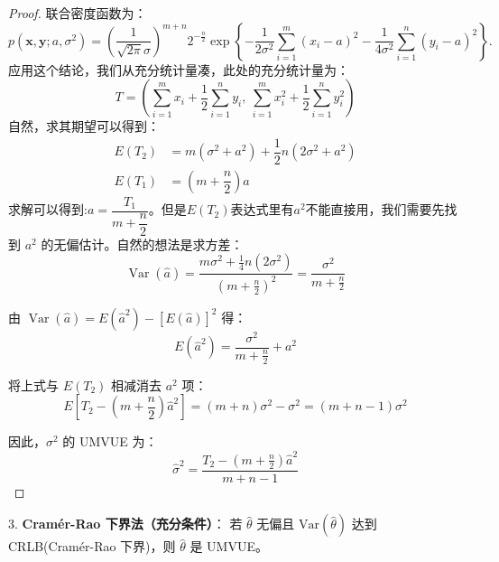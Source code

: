 \documentclass[a4paper]{ctexart}
\begin{document}
\begin{proof}
    联合密度函数为：
    \begin{equation}
    p(\boldsymbol{x}, \boldsymbol{y}; a, \sigma^2) = \left( \frac{1}{\sqrt{2\pi}\sigma} \right)^{m+n} 2^{-\frac{n}{2}} \exp \left\{ -\frac{1}{2\sigma^2} \sum_{i=1}^m (x_i - a)^2 - \frac{1}{4\sigma^2} \sum_{i=1}^n (y_i - a)^2 \right\}.
    \end{equation}
    应用这个结论，我们从充分统计量凑，此处的充分统计量为：
    \begin{equation}
        T = \left( \sum_{i=1}^m x_i + \frac{1}{2} \sum_{i=1}^n y_i,\ \sum_{i=1}^m x_i^2 + \frac{1}{2} \sum_{i=1}^n y_i^2 \right)
    \end{equation}
    自然，求其期望可以得到：
    \begin{equation}
        \begin{aligned}
            E(T_2)&=m(\sigma^2+a^2) +\dfrac{1}{2}n(2\sigma^2+a^2)\\
            E(T_1)&=(m+\dfrac{n}{2})a
        \end{aligned}
    \end{equation}
    求解可以得到:$a=\dfrac{T_1}{m+\dfrac{n}{2}}$。但是$E(T_2)$表达式里有$a^2$不能直接用，我们需要先找到 $a^2$ 的无偏估计。自然的想法是求方差：
    \begin{equation}
    \operatorname{Var}(\hat{a}) = \frac{m\sigma^2 + \frac{1}{4}n(2\sigma^2)}{\left(m + \frac{n}{2}\right)^2} = \frac{\sigma^2}{m + \frac{n}{2}}
    \end{equation}

    由 $\operatorname{Var}(\hat{a}) = E(\hat{a}^2) - [E(\hat{a})]^2$ 得：
    \begin{equation}
    E(\hat{a}^2) = \frac{\sigma^2}{m + \frac{n}{2}} + a^2
    \end{equation}

    将上式与 $E(T_2)$ 相减消去 $a^2$ 项：
    \begin{equation}
    E\left[ T_2 - \left(m + \frac{n}{2}\right)\hat{a}^2 \right] = (m+n)\sigma^2 - \sigma^2 = (m+n-1)\sigma^2
    \end{equation}

    因此，$\sigma^2$ 的 UMVUE 为：
    \begin{equation}
    \hat{\sigma}^2 = \frac{T_2 - \left(m + \frac{n}{2}\right)\hat{a}^2}{m+n-1}
    \end{equation}
\end{proof}

3. \textbf{Cramér-Rao 下界法（充分条件）}：
   若 \(\hat{\theta}\) 无偏且 \(\mathrm{Var}(\hat{\theta})\) 达到 CRLB(Cramér-Rao 下界)，则 \(\hat{\theta}\) 是 UMVUE。
\end{document}

